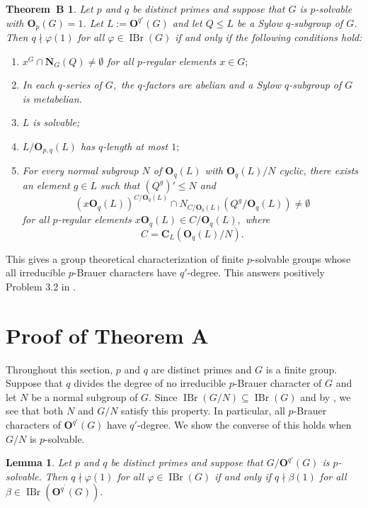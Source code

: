 \documentclass[12pt]{amsart}
\newtheorem{lemma}[theorem]{Lemma}
\newtheorem*{thmB}{Theorem~B}
\theoremstyle{remark}
\numberwithin{equation}{section}
\begin{document}
\begin{thmB}\label{th:main2}
Let $p$ and $q$ be distinct primes and suppose that $G$ is $p$-solvable with ${\mathbf{O}}_p(G)=1$. Let $L:={\mathbf{O}}^{q'}(G)$ and let $Q\leq L$ be a Sylow $q$-subgroup of $G$. Then $q\nmid\varphi(1)$ for all $\varphi\in\operatorname{IBr}(G)$ if and only if the following conditions hold:
\begin{enumerate}[$(1)$]
\item $x^G\cap {\mathbf{N}}_G(Q)\neq\emptyset$ for all $p$-regular elements $x\in G;$
\item In each $q$-series of $G,$ the $q$-factors are abelian and a Sylow $q$-subgroup of $G$ is metabelian.
\item $L$ is solvable;
\item $L/{\mathbf{O}}_{p,q}(L)$ has $q$-length at most $1;$
\item For every normal subgroup $N$ of ${\mathbf{O}}_q(L)$ with ${\mathbf{O}}_q(L)/N$ cyclic, there exists an element $g\in L$ such that $(Q^g)'\leq N$ and $$(x {\mathbf{O}}_q (L))^{C/{\mathbf{O}}_q(L)} \cap N_{C/{\mathbf{O}}_q (L)} (Q^g/{\mathbf{O}}_q (L)) \neq \emptyset$$ for all $p$-regular elements $x {\mathbf{O}}_q (L) \in C/{\mathbf{O}}_q (L),$ where $$C = {\mathbf{C}}_L ({\mathbf{O}}_q (L)/N).$$
\end{enumerate}

\end{thmB}

This gives a group theoretical characterization of finite $p$-solvable groups whose all irreducible $p$-Brauer characters have $q'$-degree. This answers positively Problem 3.2 in \cite{N1}.

\section{Proof of Theorem A}

Throughout this section, $p$ and $q$ are distinct primes and $G$ is a finite group. Suppose that $q$ divides the degree of no irreducible $p$-Brauer character of $G$ and let $N$ be a normal subgroup of $G.$ Since $\operatorname{IBr}(G/N)\subseteq\operatorname{IBr}(G)$ and by \cite[Corollary~8.7]{Navarro}, we see that both $N$ and $G/N$ satisfy this property.  In particular,  all $p$-Brauer characters of ${\mathbf{O}}^{q'}(G)$ have $q'$-degree.  We show the converse of this holds when $G/N$ is $p$-solvable.

\begin{lemma}\label{lem1} Let $p$ and $q$ be distinct primes and
suppose that $G/{\mathbf{O}}^{q'}(G)$ is $p$-solvable. Then $q\nmid \varphi(1)$ for all $\varphi\in\operatorname{IBr}(G)$ if and only if $q\nmid \beta(1)$ for all $\beta\in\operatorname{IBr}({\mathbf{O}}^{q^\prime}(G)).$
\end{lemma}
\end{document}
